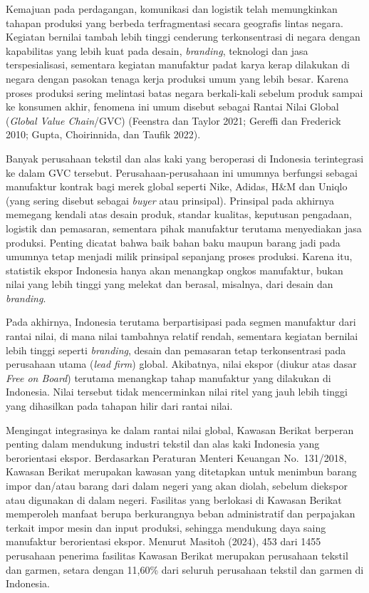 \documentclass[
  manuscript=article,
  layout=publish,
  year=2026,
  volume=1,
]{den}
\begin{document}
Kemajuan pada perdagangan, komunikasi dan logistik telah memungkinkan
tahapan produksi yang berbeda terfragmentasi secara geografis lintas
negara. Kegiatan bernilai tambah lebih tinggi cenderung terkonsentrasi
di negara dengan kapabilitas yang lebih kuat pada desain,
\emph{branding}, teknologi dan jasa terspesialisasi, sementara kegiatan
manufaktur padat karya kerap dilakukan di negara dengan pasokan tenaga
kerja produksi umum yang lebih besar. Karena proses produksi sering
melintasi batas negara berkali-kali sebelum produk sampai ke konsumen
akhir, fenomena ini umum disebut sebagai Rantai Nilai Global
(\emph{Global Value Chain}/GVC) (Feenstra dan Taylor 2021; Gereffi dan
Frederick 2010; Gupta, Choirinnida, dan Taufik 2022).

Banyak perusahaan tekstil dan alas kaki yang beroperasi di Indonesia
terintegrasi ke dalam GVC tersebut. Perusahaan-perusahaan ini umumnya
berfungsi sebagai manufaktur kontrak bagi merek global seperti Nike,
Adidas, H\&M dan Uniqlo (yang sering disebut sebagai \emph{buyer} atau
prinsipal). Prinsipal pada akhirnya memegang kendali atas desain produk,
standar kualitas, keputusan pengadaan, logistik dan pemasaran, sementara
pihak manufaktur terutama menyediakan jasa produksi. Penting dicatat
bahwa baik bahan baku maupun barang jadi pada umumnya tetap menjadi
milik prinsipal sepanjang proses produksi. Karena itu, statistik ekspor
Indonesia hanya akan menangkap ongkos manufaktur, bukan nilai yang lebih
tinggi yang melekat dan berasal, misalnya, dari desain dan
\emph{branding}.

Pada akhirnya, Indonesia terutama berpartisipasi pada segmen manufaktur
dari rantai nilai, di mana nilai tambahnya relatif rendah, sementara
kegiatan bernilai lebih tinggi seperti \emph{branding}, desain dan
pemasaran tetap terkonsentrasi pada perusahaan utama (\emph{lead firm})
global. Akibatnya, nilai ekspor (diukur atas dasar \emph{Free on Board})
terutama menangkap tahap manufaktur yang dilakukan di Indonesia. Nilai
tersebut tidak mencerminkan nilai ritel yang jauh lebih tinggi yang
dihasilkan pada tahapan hilir dari rantai nilai.

Mengingat integrasinya ke dalam rantai nilai global, Kawasan Berikat
berperan penting dalam mendukung industri tekstil dan alas kaki
Indonesia yang berorientasi ekspor. Berdasarkan Peraturan Menteri
Keuangan No.~131/2018, Kawasan Berikat merupakan kawasan yang ditetapkan
untuk menimbun barang impor dan/atau barang dari dalam negeri yang akan
diolah, sebelum diekspor atau digunakan di dalam negeri. Fasilitas yang
berlokasi di Kawasan Berikat memperoleh manfaat berupa berkurangnya
beban administratif dan perpajakan terkait impor mesin dan input
produksi, sehingga mendukung daya saing manufaktur berorientasi ekspor.
Menurut Masitoh (2024), 453 dari 1455 perusahaan penerima fasilitas
Kawasan Berikat merupakan perusahaan tekstil dan garmen, setara dengan
11,60\% dari seluruh perusahaan tekstil dan garmen di Indonesia.
\end{document}
